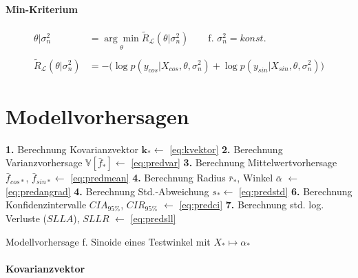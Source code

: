 \paragraph*{Min-Kriterium}


\begin{align}\label{eq:fmincon}
\theta|\sigma_n^2 &= \underset{\theta}{\arg\min} \tilde{R}_{\mathcal{L}}(\theta|\sigma_n^2) \qquad \text{f. } \sigma_n^2 = konst. \nonumber \\
\\
\tilde{R}_{\mathcal{L}}(\theta|\sigma_n^2) &= -\big( \log p(y_{cos}|X_{cos}, \theta, \sigma_n^2) + \log p(y_{sin}|X_{sin}, \theta, \sigma_n^2) \big) \nonumber
\end{align}


\clearpage


\section{Modellvorhersagen}


\begin{algorithm}[htp]
	\SetAlgoLined
	\textbf{1.} Berechnung Kovarianzvektor $\mathbf{k}_* \leftarrow$ \autoref{eq:kvektor}\;
	\textbf{2.} Berechnung Varianzvorhersage $\mathbb{V}\left[ \bar{f}_* \right] \leftarrow$ \autoref{eq:predvar}\;
	\textbf{3.} Berechnung Mittelwertvorhersage $\bar{f}_{cos*}$, $\bar{f}_{sin*} \leftarrow$ \autoref{eq:predmean}\;
	\textbf{4.} Berechnung Radius $\bar{r}_*$, Winkel $\bar{\alpha}$ $\leftarrow$ \autoref{eq:predangrad}\;
	\textbf{4.} Berechnung Std.-Abweichung $s_* \leftarrow$ \autoref{eq:predstd}\;
	\textbf{6.} Berechnung Konfidenzintervalle $CIA_{95\%}$, $CIR_{95\%}$ $\leftarrow$ \autoref{eq:predci}\;
	\textbf{7.} Berechnung std. log. Verluste ($SLLA$), $SLLR$ $\leftarrow$ \autoref{eq:predsll}
	\caption{Modellvorhersage f. Sinoide eines Testwinkel mit $X_* \mapsto \alpha_*$}
	\label{alg:gprvorhersage}
\end{algorithm}


\paragraph*{Kovarianzvektor}

